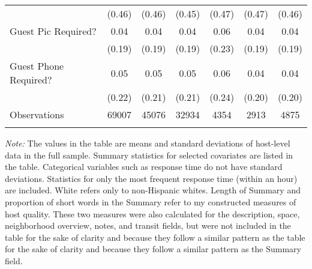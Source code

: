 \begin{table}[htbp]
\begin{center}
\begin{tabular}{l c | c | c c c c}
 & (0.46) & (0.46) & (0.45) & (0.47) & (0.47) & (0.46) \\
 Guest Pic Required? & 0.04 & 0.04 & 0.04 & 0.06 & 0.04 & 0.04 \\
 & (0.19) & (0.19) & (0.19) & (0.23) & (0.19) & (0.19) \\
 Guest Phone Required? & 0.05 & 0.05 & 0.05 & 0.06 & 0.04 & 0.04 \\
 & (0.22) & (0.21) & (0.21) & (0.24) & (0.20) & (0.20) \\
\hline
Observations & 69007 & 45076 & 32934 & 4354 & 2913 & 4875
\\
\hline\hline\noalign{\smallskip} \end{tabular} 
\begin{minipage}{6in}
{\it Note:} The values in the table are means and standard deviations of host-level data in the full sample. Summary statistics for selected covariates are listed in the table. Categorical variables such as response time do not have standard deviations. Statistics for only the most frequent response time (within an hour) are included. White refers only to non-Hispanic whites. Length of Summary and proportion of short words in the Summary refer to my constructed measures of host quality. These two measures were also calculated for the description, space, neighborhood overview, notes, and transit fields, but were not included in the table for the sake of clarity and because they follow a similar pattern as the table for the sake of clarity and because they follow a similar pattern as the Summary field.
\end{minipage}
\end{center}
\end{table}
